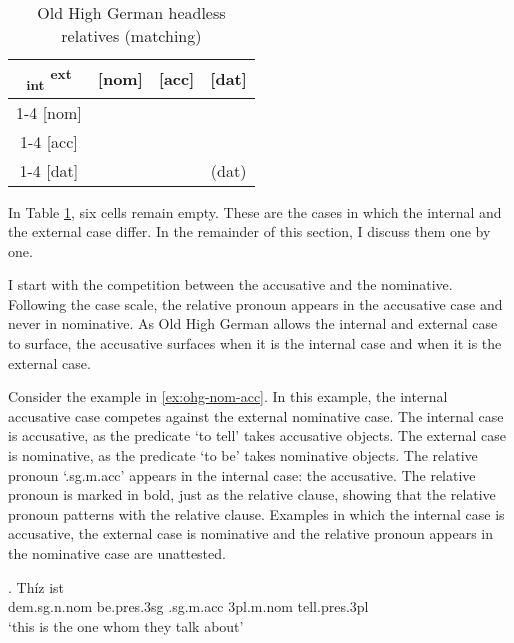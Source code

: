 \begin{table}[ht]
  \center
  \caption{Old High German headless relatives (matching)}
  \begin{tabular}{c|c|c|c}
    \toprule
     \textsubscript{\ac{int}} \textsuperscript{\ac{ext}}
          & [\ac{nom}]
          & [\ac{acc}]
          & [\ac{dat}]
          \\ \cmidrule{1-4}
      [\ac{nom}]
          & \cellcolor{LG}{\ac{nom}}
          &
          &
          \\ \cmidrule{1-4}
      [\ac{acc}]
          &
          & \cellcolor{DG}{\ac{acc}}
          &
          \\ \cmidrule{1-4}
      [\ac{dat}]
          &
          &
          & (\ac{dat})
          \\
    \bottomrule
  \end{tabular}
    \label{tbl:summary-ohg-matching}
\end{table}

In Table \ref{tbl:summary-ohg-matching}, six cells remain empty. These are the cases in which the internal and the external case differ. In the remainder of this section, I discuss them one by one.

I start with the competition between the accusative and the nominative. Following the case scale, the relative pronoun appears in the accusative case and never in nominative. As Old High German allows the internal and external case to surface, the accusative surfaces when it is the internal case and when it is the external case.

Consider the example in \ref{ex:ohg-nom-acc}. In this example, the internal accusative case competes against the external nominative case.
The internal case is accusative, as the predicate  `to tell' takes accusative objects.
The external case is nominative, as the predicate  `to be' takes nominative objects.
The relative pronoun  `.\ac{sg}.\ac{m}.\ac{acc}' appears in the internal case: the accusative. The relative pronoun is marked in bold, just as the relative clause, showing that the relative pronoun patterns with the relative clause.
Examples in which the internal case is accusative, the external case is nominative and the relative pronoun appears in the nominative case are unattested.

\exg. Thíz ist   \\
\ac{dem}.\ac{sg}.\ac{n}.\ac{nom} be.\ac{pres}.3\ac{sg}\scsub{[nom]} .\ac{sg}.\ac{m}.\ac{acc} 3\ac{pl}.\ac{m}.\ac{nom} tell.\ac{pres}.3\ac{pl}\scsub{[acc]}\\
`this is the one whom they talk about' \label{ex:ohg-nom-acc}

